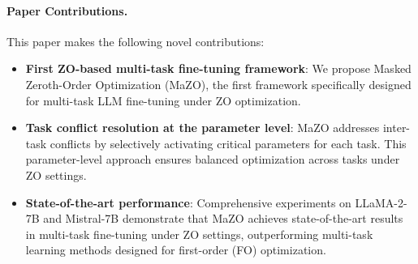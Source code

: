 \paragraph{Paper Contributions.} This paper makes the following novel contributions:
\begin{itemize}[leftmargin=*]
\vspace{-5pt}
    \item \textbf{First ZO-based multi-task fine-tuning framework}: We propose Masked Zeroth-Order Optimization (MaZO), the first framework specifically designed for multi-task LLM fine-tuning under ZO optimization. 
    \vspace{-5pt}
    \item \textbf{Task conflict resolution at the parameter level}: MaZO addresses inter-task conflicts by selectively activating critical parameters for each task. This parameter-level approach ensures balanced optimization across tasks under ZO settings.
    \vspace{-5pt}
    \item \textbf{State-of-the-art performance}: Comprehensive experiments on LLaMA-2-7B and Mistral-7B demonstrate that MaZO achieves state-of-the-art results in multi-task fine-tuning under ZO settings, outperforming multi-task learning methods designed for first-order (FO) optimization.
\end{itemize}





